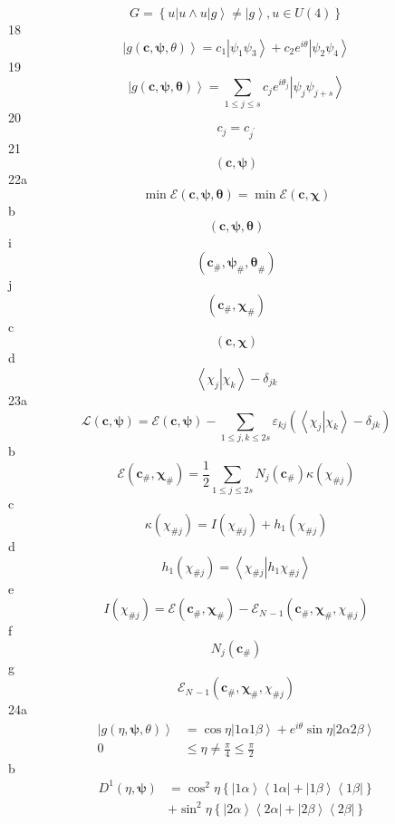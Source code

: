 \documentclass[aps,preprint]{revtex4}%
\begin{document}
\[
G=\left\{  \left.  u\right\vert u\wedge u\left\vert g\right\rangle
\neq\left\vert g\right\rangle ,u\in U\left(  4\right)  \right\}
\]
18%
\[
\left\vert g\left(  \mathbf{c,\psi,}\theta\right)  \right\rangle
=c_{1}\left\vert \psi_{1}\psi_{3}\right\rangle +c_{2}e^{i\theta}\left\vert
\psi_{2}\psi_{4}\right\rangle
\]
19%
\begin{equation}
\left\vert g\left(  \mathbf{c,\psi,\theta}\right)  \right\rangle =\sum_{1\leq
j\leq s}c_{j}e^{i\theta_{j}}\left\vert \psi_{j}\psi_{j+s}\right\rangle
\nonumber
\end{equation}
20%
\[
c_{j}=c_{j^{\prime}}%
\]
21%
\[
\left(  \mathbf{c,\psi}\right)
\]
22a%
\[
\min\mathcal{E}\left(  \mathbf{c},\mathbf{\psi,\theta}\right)  =\min
\mathcal{E}\left(  \mathbf{c},\mathbf{\chi}\right)
\]
b%
\[
\left(  \mathbf{c},\mathbf{\psi,\theta}\right)
\]
i%
\[
\left(  \mathbf{c}_{\#},\mathbf{\psi}_{\#}\mathbf{,\theta}_{\#}\right)
\]
j%
\[
\left(  \mathbf{c}_{\#},\mathbf{\chi}_{\#}\right)
\]
c%
\[
\left(  \mathbf{c},\mathbf{\chi}\right)
\]
d%
\[
\left\langle \left.  \chi_{j}\right\vert \chi_{k}\right\rangle -\delta_{jk}%
\]
23a%
\[
\mathcal{L}\left(  \mathbf{c,\psi}\right)  =\mathcal{E}\left(  \mathbf{c,\psi
}\right)  -\sum_{1\leq j,k\leq2s}\varepsilon_{kj}\left(  \left\langle \left.
\chi_{j}\right\vert \chi_{k}\right\rangle -\delta_{jk}\right)
\]
b%
\[
\mathcal{E}\left(  \mathbf{c}_{\#},\mathbf{\chi}_{\#}\right)  =\frac{1}{2}%
\sum_{1\leq j\leq2s}N_{j}\left(  \mathbf{c}_{\#}\right)  \kappa\left(
\chi_{\#j}\right)
\]
c%
\[
\kappa\left(  \chi_{\#j}\right)  =I\left(  \chi_{\#j}\right)  +h_{1}\left(
\chi_{\#j}\right)
\]
d%
\[
h_{1}\left(  \chi_{\#j}\right)  =\left\langle \left.  \chi_{\#j}\right\vert
h_{1}\chi_{\#j}\right\rangle
\]
e%
\[
I\left(  \chi_{\#j}\right)  =\mathcal{E}\left(  \mathbf{c}_{\#},\mathbf{\chi
}_{\#}\right)  -\mathcal{E}_{N\,-1}\left(  \mathbf{c}_{\#},\mathbf{\chi}%
_{\#}\mathbf{,}\chi_{\#j}\right)
\]
f%
\[
N_{j}\left(  \mathbf{c}_{\#}\right)
\]
g%
\[
\mathcal{E}_{N\,-1}\left(  \mathbf{c}_{\#},\mathbf{\chi}_{\#}\mathbf{,}%
\chi_{\#j}\right)
\]
24a%
\begin{align*}
\left\vert g\left(  \eta,\mathbf{\psi,}\theta\right)  \right\rangle  &
=\cos\eta\left\vert 1\alpha1\beta\right\rangle +e^{i\theta}\sin\eta\left\vert
2\alpha2\beta\right\rangle \\
0  &  \leq\eta\neq\frac{\pi}{4}\leq\frac{\pi}{2}%
\end{align*}
b%
\begin{align*}
D^{1}\left(  \eta,\mathbf{\psi}\right)   &  =\cos^{2}\eta\left\{  \left\vert
1\alpha\right\rangle \left\langle 1\alpha\right\vert +\left\vert
1\beta\right\rangle \left\langle 1\beta\right\vert \right\} \\
&  +\sin^{2}\eta\left\{  \left\vert 2\alpha\right\rangle \left\langle
2\alpha\right\vert +\left\vert 2\beta\right\rangle \left\langle 2\beta
\right\vert \right\}
\end{align*}
\end{document}
